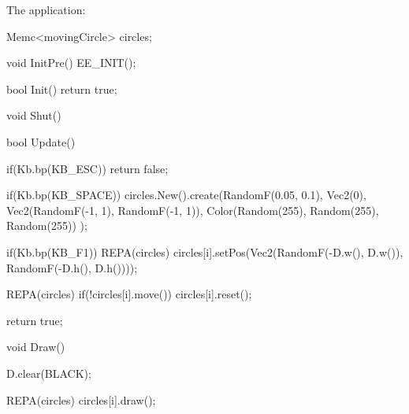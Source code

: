 The application:
\begin{code}
Memc<movingCircle> circles;

void InitPre()
{
   EE_INIT();
}

bool Init()
{ 
   return true;
}

void Shut() {}

bool Update()
{
   if(Kb.bp(KB_ESC)) return false;
  
   if(Kb.bp(KB_SPACE))
   {
      circles.New().create(RandomF(0.05, 0.1), 
                           Vec2(0), 
                           Vec2(RandomF(-1, 1), RandomF(-1, 1)), 
                           Color(Random(255), Random(255), Random(255))
                           );
   }
   
   if(Kb.bp(KB_F1))
   {
      REPA(circles)
      {
         circles[i].setPos(Vec2(RandomF(-D.w(), D.w()), RandomF(-D.h(), D.h())));
      }
   }
   
   REPA(circles)
   {
      if(!circles[i].move()) circles[i].reset();
   }
   
   return true;
}

void Draw()
{
   D.clear(BLACK);
  
   REPA(circles)
   {
      circles[i].draw();
   }
}
\end{code}
